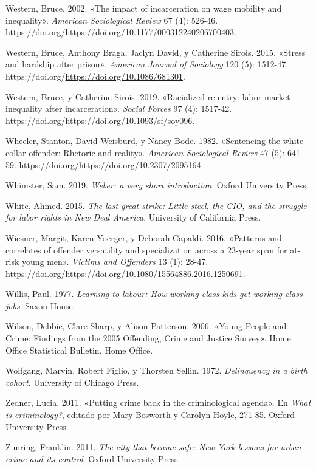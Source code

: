 \documentclass[
  spanish,
  letterpaper,
  DIV=11,
  numbers=noendperiod]{scrreprt}
\newlength{\cslhangindent}
\newenvironment{CSLReferences}[2] %
 {\begin{list}{}{%
  \setlength{\itemindent}{0pt}
  \setlength{\leftmargin}{0pt}
  \setlength{\parsep}{0pt}
  \ifodd #1
   \setlength{\leftmargin}{\cslhangindent}
   \setlength{\itemindent}{-1\cslhangindent}
  \fi
  \setlength{\itemsep}{#2\baselineskip}}}
 {\end{list}}
\begin{document}
\begin{CSLReferences}{1}{0}
Western, Bruce. 2002. {«The impact of incarceration on wage mobility and
inequality»}. \emph{American Sociological Review} 67 (4): 526-46.
https://doi.org/\url{https://doi.org/10.1177/000312240206700403}.

Western, Bruce, Anthony Braga, Jaclyn David, y Catherine Sirois. 2015.
{«Stress and hardship after prison»}. \emph{American Journal of
Sociology} 120 (5): 1512-47.
https://doi.org/\url{https://doi.org/10.1086/681301}.

Western, Bruce, y Catherine Sirois. 2019. {«Racialized re-entry: labor
market inequality after incarceration»}. \emph{Social Forces} 97 (4):
1517-42. https://doi.org/\url{https://doi.org/10.1093/sf/soy096}.

Wheeler, Stanton, David Weisburd, y Nancy Bode. 1982. {«Sentencing the
white-collar offender: Rhetoric and reality»}. \emph{American
Sociological Review} 47 (5): 641-59.
https://doi.org/\url{https://doi.org/10.2307/2095164}.

Whimster, Sam. 2019. \emph{Weber: a very short introduction}. Oxford
University Press.

White, Ahmed. 2015. \emph{The last great strike: Little steel, the CIO,
and the struggle for labor rights in New Deal America}. University of
California Press.

Wiesner, Margit, Karen Yoerger, y Deborah Capaldi. 2016. {«Patterns and
correlates of offender versatility and specialization across a 23-year
span for at-risk young men»}. \emph{Victims and Offenders} 13 (1):
28-47.
https://doi.org/\url{https://doi.org/10.1080/15564886.2016.1250691}.

Willis, Paul. 1977. \emph{Learning to labour: How working class kids get
working class jobs}. Saxon House.

Wilson, Debbie, Clare Sharp, y Alison Patterson. 2006. {«Young People
and Crime: Findings from the 2005 Offending, Crime and Justice Survey»}.
Home Office Statistical Bulletin. Home Office.

Wolfgang, Marvin, Robert Figlio, y Thorsten Sellin. 1972.
\emph{Delinquency in a birth cohort}. University of Chicago Press.

Zedner, Lucia. 2011. {«Putting crime back in the criminological
agenda»}. En \emph{What is criminology?}, editado por Mary Bosworth y
Carolyn Hoyle, 271-85. Oxford University Press.

Zimring, Franklin. 2011. \emph{The city that became safe: New York
lessons for urban crime and its control}. Oxford University Press.

\end{CSLReferences}
\end{document}
